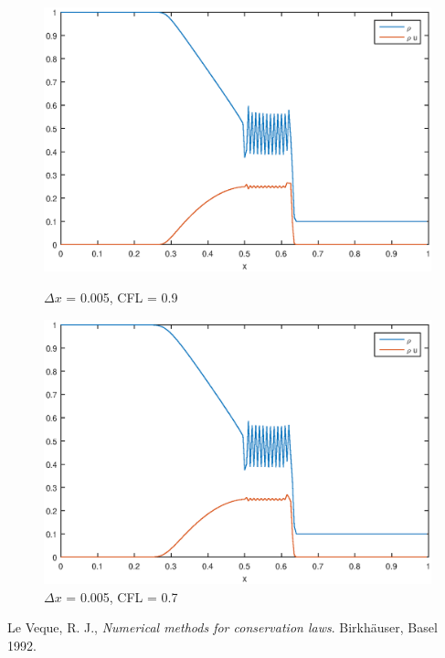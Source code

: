 \documentclass[a4paper, 10pt]{article}
\begin{document}
\begin{figure}[!htb]
	\centering
	\begin{minipage}{.5\textwidth}
		\centering
		\includegraphics[width=1\linewidth]{img/2.eps}
		\caption{$ \Delta x $ = 0.005, CFL = 0.9}
	\end{minipage}%
	\begin{minipage}{.5\textwidth}	
		\centering
		\includegraphics[width=1\linewidth]{img/3.eps}
		\caption{$ \Delta x $ = 0.005, CFL = 0.7}
	\end{minipage}
\end{figure}

\begin{thebibliography}{5}
	
Le Veque, R. J., 
\emph{Numerical methods for conservation laws}.
Birkhäuser, Basel
1992.

\end{thebibliography}
\end{document}
